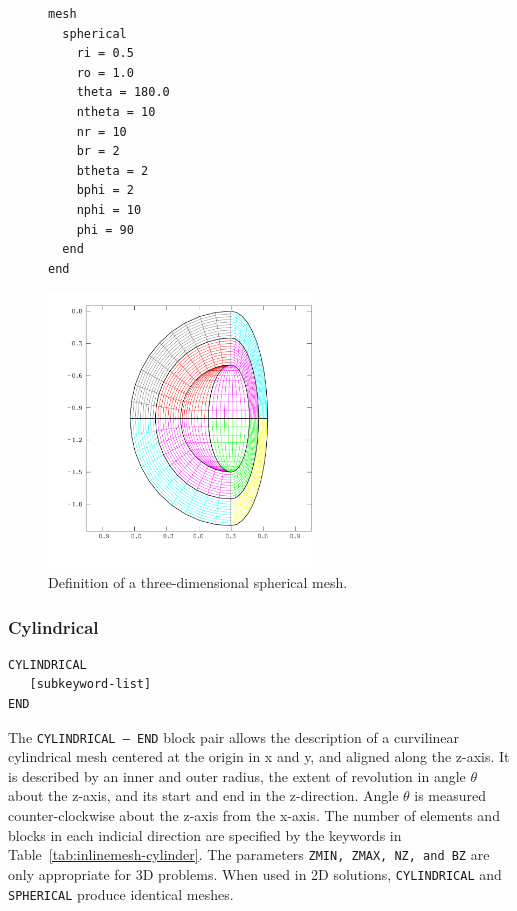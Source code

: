 \begin{figure}[htb]
\centering
  \begin{minipage}[c]{0.4\linewidth}
    \centering
{\ttfamily \begin{verbatim}
mesh
  spherical
    ri = 0.5
    ro = 1.0
    theta = 180.0
    ntheta = 10
    nr = 10
    br = 2
    btheta = 2
    bphi = 2
    nphi = 10
    phi = 90
  end
end
\end{verbatim}}
  \end{minipage}%
  \hfil
  \begin{minipage}[c]{0.6\linewidth}
    \centering
      \includegraphics[width=2.75in]{str_inline_sphere}
  \end{minipage}
  \caption{Definition of a three-dimensional spherical mesh.}
  \label{fig:str_inline_sphere}
\end{figure}

\clearpage
\subsubsection{Cylindrical}
{\ttfamily \begin{verbatim}
CYLINDRICAL
   [subkeyword-list]
END
\end{verbatim}
}

The \texttt{CYLINDRICAL -- END} block pair allows the description of a
curvilinear cylindrical mesh centered at the origin in x and y, and
aligned along the z-axis.  It is described by an inner and outer
radius, the extent of revolution in angle $\theta$ about the z-axis,
and its start and end in the z-direction.  Angle $\theta$ is measured
counter-clockwise about the z-axis from the x-axis.  The number of
elements and blocks in each indicial direction are specified by the
keywords in Table~\ref{tab:inlinemesh-cylinder}.  The parameters
\texttt{ZMIN, ZMAX, NZ, and BZ} are only appropriate for 3D
problems.  When used in 2D solutions, \texttt{CYLINDRICAL} and
\texttt{SPHERICAL} produce identical meshes.

